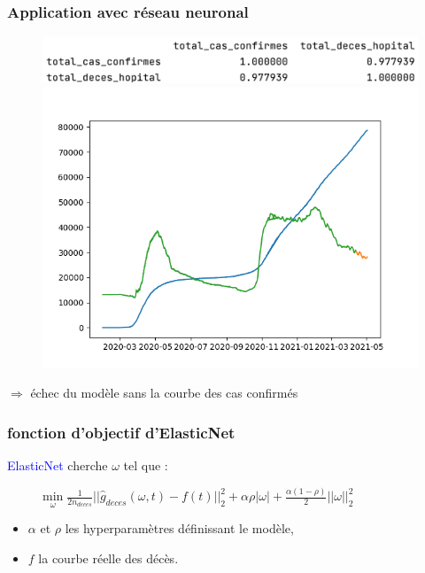 \documentclass{beamer}[aspectratio = 43]
\begin{document}
\begin{frame}
	\frametitle{Application avec réseau neuronal}
	\begin{figure}
		\includegraphics[scale=0.45]{cor1}
		\includegraphics[scale=0.4]{NN_up}
	\end{figure}
	$\Rightarrow$ échec du modèle sans la courbe des cas confirmés
\end{frame}

\appendix

\begin{frame}
	\frametitle{fonction d'objectif d'ElasticNet}
	\textcolor{blue}{ElasticNet} cherche $\omega$ tel que :
	\begin{figure}[h]
		$\underset{\omega}{\mathrm{min}} \; \frac{1}{2n_{deces}}||\hat{g}_{deces} (\omega,t) - f(t)||^{2}_{2} + \alpha \rho |\omega| + \frac{\alpha (1-\rho)}{2}||\omega||^{2}_{2}$
		\\
	\end{figure}
	\begin{itemize}
		\item[]$\alpha$ et $\rho$ les hyperparamètres définissant le modèle,\\
		\item[]$f$ la courbe réelle des décès.
	\end{itemize}
\end{frame}
\end{document}
